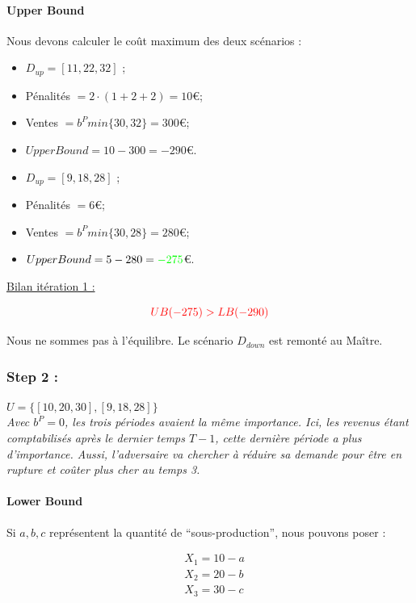 \documentclass[11pt,a4paper]{article}
\begin{document}
\paragraph{Upper Bound} Nous devons calculer le coût maximum des deux scénarios :

\begin{itemize}
Scénario 1 : Attaque $D_{up}$ (rupture)
    \item $D_{up}=[11, 22, 32]$ ;
    \item Pénalités $=2\cdot(1+2+2)=10$\euro ;
    \item Ventes $=b^Pmin\{30, 32\}=300$\euro ;
    \item $UpperBound=10-300=-290$\euro.
\end{itemize}

\begin{itemize}
Scénario 2 : Attaque $D_{down}$ (sur-stock)
    \item $D_{up}=[9, 18, 28]$ ;
    \item Pénalités $=6$\euro ;
    \item Ventes $=b^Pmin\{30, 28\}=280$\euro ;
    \item $UpperBound=5-280=\textcolor{green}{-275}$\euro.
\end{itemize}

\underline{Bilan itération 1 :}

\[
    \textcolor{red}{UB(-275)>LB(-290)}
\]

Nous ne sommes pas à l'équilibre. Le scénario $D_{down}$ est remonté au Maître.


\subsubsection{Step 2 :}

$U=\{[10, 20, 30], [9, 18, 28]\}$\\
\textit{Avec $b^P=0$, les trois périodes avaient la même importance. Ici, les revenus étant comptabilisés après le dernier temps $T-1$, cette dernière période a plus d'importance. Aussi, l'adversaire va chercher à réduire sa demande pour être en rupture et coûter plus cher au temps 3.}

\paragraph{Lower Bound}

Si $a, b, c$ représentent la quantité de ``sous-production'', nous pouvons poser :

\begin{align}
    &X_1=10-a\\
    &X_2=20-b\\
    &X_3=30-c
\end{align}
\end{document}
